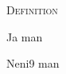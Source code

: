 \documentclass[a4paper]{article}
\begin{document}
{
	\noindent \textsc{Definition}
	\vfill
	\centerline{{\Large Ja man}}
	\vfill
}
\newpage

{
	\centerline{{\Large Neni9 man}}
}
\newpage
\end{document}
